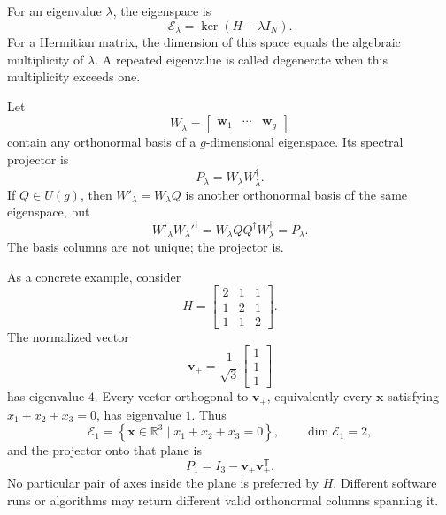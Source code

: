 For an eigenvalue \(\lambda\), the eigenspace is
\begin{equation}
  \mathcal E_{\lambda}
  =\ker(H-\lambda I_N).
  \label{eq:training-eigenspace}
\end{equation}
For a Hermitian matrix, the dimension of this space equals the algebraic
multiplicity of \(\lambda\). A repeated eigenvalue is called degenerate when
this multiplicity exceeds one.

Let
\begin{equation}
  W_{\lambda}
  =\begin{bmatrix}
    \mathbf w_1 & \cdots & \mathbf w_g
  \end{bmatrix}
\end{equation}
contain any orthonormal basis of a \(g\)-dimensional eigenspace. Its spectral
projector is
\begin{equation}
  P_{\lambda}=W_{\lambda}W_{\lambda}^{\dagger}.
  \label{eq:training-degenerate-projector}
\end{equation}
If \(Q\in U(g)\), then \(W'_{\lambda}=W_{\lambda}Q\) is another orthonormal
basis of the same eigenspace, but
\begin{equation}
  W'_{\lambda}W_{\lambda}'^{\dagger}
  =W_{\lambda}QQ^{\dagger}W_{\lambda}^{\dagger}
  =P_{\lambda}.
\end{equation}
The basis columns are not unique; the projector is.

As a concrete example, consider
\begin{equation}
  H=
  \begin{bmatrix}
    2 & 1 & 1\\
    1 & 2 & 1\\
    1 & 1 & 2
  \end{bmatrix}.
\end{equation}
The normalized vector
\begin{equation}
  \mathbf v_+=\frac{1}{\sqrt3}
  \begin{bmatrix}1\\1\\1\end{bmatrix}
\end{equation}
has eigenvalue \(4\). Every vector orthogonal to \(\mathbf v_+\), equivalently
every \(\mathbf x\) satisfying \(x_1+x_2+x_3=0\), has eigenvalue \(1\). Thus
\begin{equation}
  \mathcal E_1
  =\left\{\mathbf x\in\mathbb R^3\mid x_1+x_2+x_3=0\right\},
  \qquad
  \dim\mathcal E_1=2,
\end{equation}
and the projector onto that plane is
\begin{equation}
  P_1=I_3-\mathbf v_+\mathbf v_+^{\mathsf T}.
\end{equation}
No particular pair of axes inside the plane is preferred by \(H\). Different
software runs or algorithms may return different valid orthonormal columns
spanning it.

